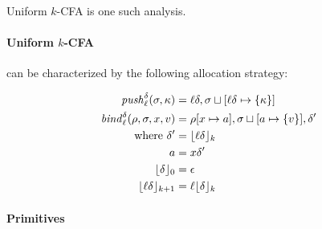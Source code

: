 \documentclass[preprint,onecolumn,9pt]{sigplanconf} %
\begin{document}
Uniform \(k\)-CFA is one such analysis.

\paragraph{Uniform \(k\)-CFA} can be characterized by the following allocation
strategy:

\begin{align*}
\mathit{push}_{\ell}^{\delta}(\sigma,\kappa) &=
  {\ell}{\delta},\sigma\sqcup[{\ell}{\delta}\mapsto\{\kappa\}] \\
\mathit{bind}^{\delta}_{\ell}(\rho,\sigma,x,v) &= \rho[x \mapsto a],
                                           \sigma\sqcup[a \mapsto
                                             \{ v\}],
                                           {\delta}' \\
\mbox{where } {\delta}' &= \lfloor{\ell}{\delta}\rfloor_k \\
              a &= x{\delta}' \\
              \lfloor {\delta} \rfloor_0 &= {\epsilon} \\
              \lfloor {\ell}{\delta} \rfloor_{k+1} &= {\ell}\lfloor {\delta}\rfloor_k
\end{align*}


\paragraph{Primitives}

\end{document}
